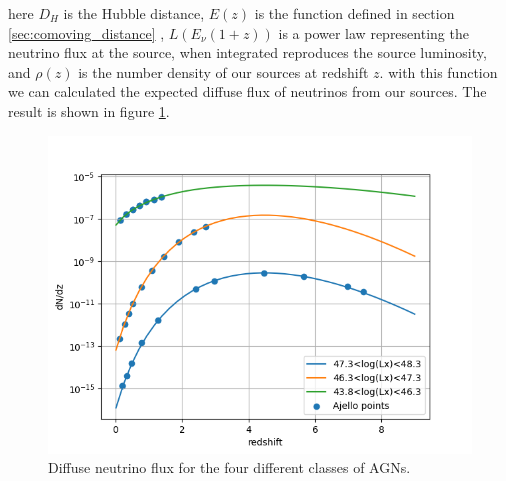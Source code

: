 \documentclass{article}
\begin{document}
here $D_H$ is the Hubble distance, $E(z)$ is the function defined in section \ref{sec:comoving_distance} , $L(E_\nu (1+z))$ is a power law representing the neutrino flux at the source, when integrated reproduces the source luminosity, and $\rho(z)$ is the number density of our sources at redshift $z$.
with this function we can calculated the expected diffuse flux of neutrinos from our sources. The result is shown in figure \ref{fig:neutrino_diffuse}.
\begin{figure}[H]
    \centering
    \includegraphics[width = \textwidth]{new_plots/Blazar_test_fit.png}
    \caption{Diffuse neutrino flux for the four different classes of AGNs.}
    \label{fig:neutrino_diffuse}
\end{figure}
\end{document}
